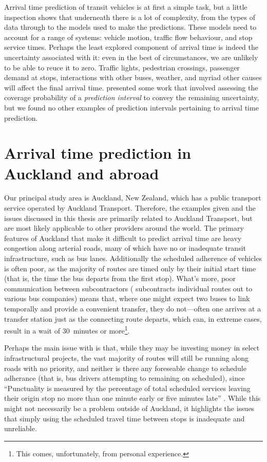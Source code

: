 Arrival time prediction of transit vehicles is at first a simple task, but a little inspection shows that underneath there is a lot of complexity, from the types of data through to the models used to make the predictions. These models need to account for a range of systems: vehicle motion, traffic flow behaviour, and stop service times. Perhaps the least explored component of arrival time is indeed the uncertainty associated with it: even in the best of circumstances, we are unlikely to be able to reuce it to zero. Traffic lights, pedestrian crossings, passenger demand at stops, interactions with other buses, weather, and myriad other causes will affect the final arrival time. \citet{Mazloumi_2011} presented some work that involved assessing the coverage probability of a \emph{prediction interval} to convey the remaining uncertainty, but we found no other examples of prediction intervals pertaining to arrival time prediction.



\section{Arrival time prediction in Auckland and abroad}
\label{sec:auckland_etas}

Our principal study area is Auckland, New Zealand, which has a public transport service operated by Auckland Transport. Therefore, the examples given and the issues discussed in this thesis are primarily related to Auckland Transport, but are most likely applicable to other providers around the world. The primary features of Auckland that make it difficult to predict arrival time are heavy congestion along arterial roads, many of which have no or inadequate transit infrastructure, such as bus lanes. Additionally the scheduled adherence of vehicles is often poor, as the majority of routes are timed only by their initial start time (that is, the time the bus departs from the first stop). What's more, poor communication between subcontractors (\AT{} subcontracts individual routes out to various bus companies) means that, where one might expect two buses to link temporally and provide a convenient transfer, they do not---often one arrives at a transfer station just as the connecting route departs, which can, in extreme cases, result in a wait of 30~minutes or more\footnote{This comes, unfortunately, from personal experience.}.


Perhaps the main issue with \AT{} is that, while they may be investing money in select infrastructural projects, the vast majority of routes will still be running along roads with no priority, and neither is there any foreseable change to schedule adherance (that is, bus drivers attempting to remaining on scheduled), since ``Punctuality is measured by the percentage of total scheduled services leaving their origin stop no more than one minute early or five minutes late'' \citep[13]{AT_report_2019}. While this might not necessarily be a problem outside of Auckland, it highlights the issues that simply using the scheduled travel time between stops is inadequate and unreliable.


